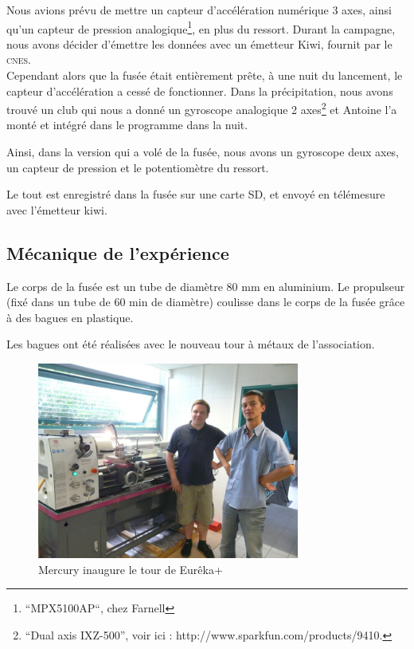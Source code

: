 \documentclass[a4paper,12pt]{scrartcl}
\begin{document}
		Nous avions prévu de mettre un capteur d'accélération numérique 3 axes, ainsi qu'un capteur de pression analogique\footnote{``MPX5100AP``, chez Farnell}, en plus du ressort.
		Durant la campagne, nous avons décider d'émettre les données avec un émetteur Kiwi, fournit par le \textsc{cnes}. \\

		Cependant alors que la fusée était entièrement prête, à une nuit du lancement, le capteur d'accélération a cessé de fonctionner.
		Dans la précipitation, nous avons trouvé un club qui nous a donné un gyroscope analogique 2 axes\footnote{``Dual axis IXZ-500'', voir ici : http://www.sparkfun.com/products/9410.} et Antoine l'a monté et intégré dans le programme dans la nuit.
		
		Ainsi, dans la version qui a volé de la fusée, nous avons un gyroscope deux axes, un capteur de pression et le potentiomètre du ressort.
		
		Le tout est enregistré dans la fusée sur une carte SD, et envoyé en télémesure avec l'émetteur kiwi.
	      \subsection{Mécanique de l'expérience}	
	      Le corps de la fusée est un tube de diamètre 80 mm en aluminium.
	      Le propulseur (fixé dans un tube de 60 min de diamètre) coulisse dans le corps de la fusée grâce à des bagues en plastique.
	      
	      Les bagues ont été réalisées avec le nouveau tour à métaux de l'association.
	     \begin{figure}[H]
		    \begin{center}
		      \caption{Mercury inaugure le tour de Eurêka+}
		      \includegraphics[height=244px, width=326px]{Photos_Mercury/tour.jpg}
		    \end{center}
	      \end{figure}
\end{document}
